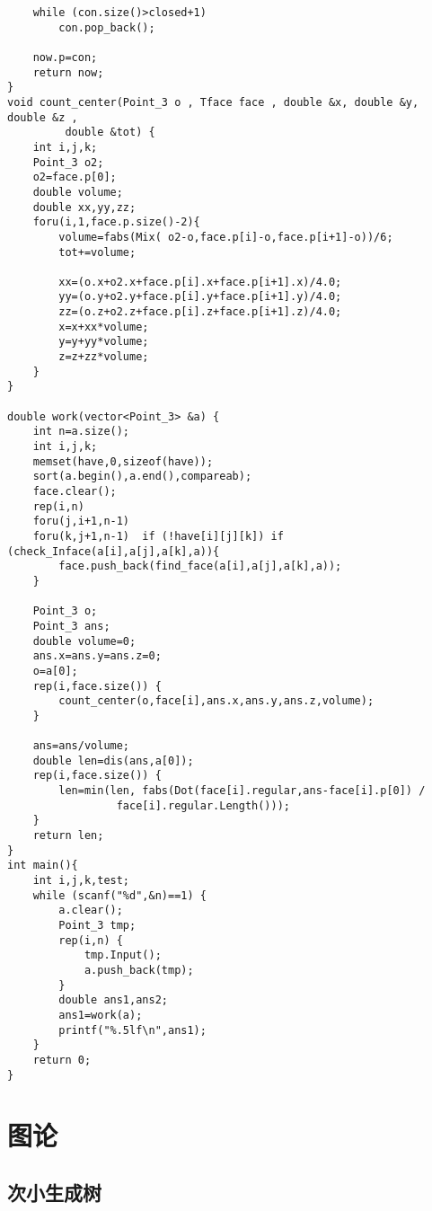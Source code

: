\documentclass{article}
\begin{document}
\begin{lstlisting}
    while (con.size()>closed+1)
        con.pop_back();

    now.p=con;
    return now;
}
void count_center(Point_3 o , Tface face , double &x, double &y, double &z ,
         double &tot) {
    int i,j,k;
    Point_3 o2;
    o2=face.p[0];
    double volume;
    double xx,yy,zz;
    foru(i,1,face.p.size()-2){
        volume=fabs(Mix( o2-o,face.p[i]-o,face.p[i+1]-o))/6;
        tot+=volume;

        xx=(o.x+o2.x+face.p[i].x+face.p[i+1].x)/4.0;
        yy=(o.y+o2.y+face.p[i].y+face.p[i+1].y)/4.0;
        zz=(o.z+o2.z+face.p[i].z+face.p[i+1].z)/4.0;
        x=x+xx*volume;
        y=y+yy*volume;
        z=z+zz*volume;
    }
}

double work(vector<Point_3> &a) {
    int n=a.size();
    int i,j,k;
    memset(have,0,sizeof(have));
    sort(a.begin(),a.end(),compareab);
    face.clear();
    rep(i,n)
    foru(j,i+1,n-1)
    foru(k,j+1,n-1)  if (!have[i][j][k]) if (check_Inface(a[i],a[j],a[k],a)){
        face.push_back(find_face(a[i],a[j],a[k],a));
    }

    Point_3 o;
    Point_3 ans;
    double volume=0;
    ans.x=ans.y=ans.z=0;
    o=a[0];
    rep(i,face.size()) {
        count_center(o,face[i],ans.x,ans.y,ans.z,volume);
    }

    ans=ans/volume;
    double len=dis(ans,a[0]);
    rep(i,face.size()) {
        len=min(len, fabs(Dot(face[i].regular,ans-face[i].p[0]) /
                 face[i].regular.Length()));
    }
    return len;
}
int main(){
    int i,j,k,test;
    while (scanf("%d",&n)==1) {
        a.clear();
        Point_3 tmp;
        rep(i,n) {
            tmp.Input();
            a.push_back(tmp);
        }
        double ans1,ans2;
        ans1=work(a);
        printf("%.5lf\n",ans1);
    }
    return 0;
}
\end{lstlisting}

\section{图论}

\subsection{次小生成树}
\end{document}
